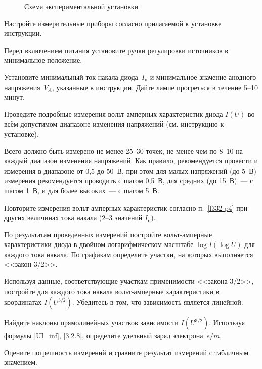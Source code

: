 \begin{figure}[h!]
    \centering
    \caption{Схема экспериментальной установки}
\end{figure}

\begin{lab:task}



    
\item Настройте измерительные приборы согласно прилагаемой к установке
инструкции.

\item Перед включением питания установите ручки регулировки источников
в минимальное положение.

\item Установите минимальный ток накала диода~$I_\text{н}$
и минимальное значение анодного напряжения~$V_{A}$, 
указанные в инструкции. Дайте лампе прогреться в течение 5--10 минут.

\item\label{l332-p4} Проведите подробные измерения вольт-амперных характеристик диода 
$I(U)$ во всём допустимом диапазоне изменения напряжений  (см. инструкцию
к установке). 

Всего должно быть измерено не менее 25--30 точек, 
не менее чем по 8--10 на каждый диапазон изменения напряжений. 
Как правило, рекомендуется провести и измерения в диапазоне от 0,5 до 50~В, 
при этом для малых напряжений (до 5~В) измерения рекомендуется проводить 
с шагом 0,5~В, для средних (до 15~В)~--- с шагом 1~В, и 
для более высоких~--- с шагом 5~В.

\item Повторите измерения вольт-амперных характеристик согласно п.~\ref{l332-p4}
при других величинах тока накала (2--3 значений $I_{н}$).


\item По результатам проведенных измерений постройте 
вольт-амперные характеристики диода 
в двойном логарифмическом масштабе
$\log I (\log U)$
для каждого тока накала. По графикам определите участки, на которых
выполняется <<закон 3/2>>.

\item Используя данные, соответствующие участкам применимости
<<закона 3/2>>, постройте для каждого тока накала вольт-амперные 
характеристики в координатах $I(U^{3/2})$. 
Убедитесь в том, что зависимость является линейной. 

\item Найдите наклоны прямолинейных участков зависимости
$I(U^{3/2})$. Используя формулы \eqref{UI_inf}, \eqref{3.2.8}, 
определите удельный заряд электрона~$e/m$.

\item Оцените погрешность измерений и 
сравните результат измерений с табличным значением.

\end{lab:task}


